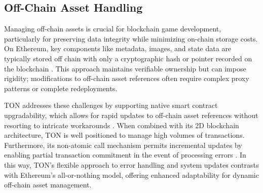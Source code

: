 \subsection{Off-Chain Asset Handling}

Managing off-chain assets is crucial for blockchain game development,
particularly for preserving data integrity while minimizing on-chain storage
costs. On Ethereum, key components like metadata, images, and state data are
typically stored off chain with only a cryptographic hash or pointer recorded on
the blockchain \cite{patelBlockchainGamingBuilding2023,
	arifBlockchainBasedMultiplayerTransaction2020}. This approach maintains
verifiable ownership but can impose rigidity; modifications to off-chain asset
references often require complex proxy patterns or complete redeployments.

TON addresses these challenges by supporting native smart contract
upgradability, which allows for rapid updates to off-chain asset references
without resorting to intricate workarounds \cite{songEnhancingOpenNetwork2025}.
When combined with its 2D blockchain architecture, TON is well positioned to
manage high volumes of transactions. Furthermore, its non-atomic call mechanism
permits incremental updates by enabling partial transaction commitment in the
event of processing errors \cite{songEnhancingOpenNetwork2025}. In this way,
TON’s flexible approach to error handling and system updates contrasts with
Ethereum’s all-or-nothing model, offering enhanced adaptability for dynamic
off-chain asset management.


